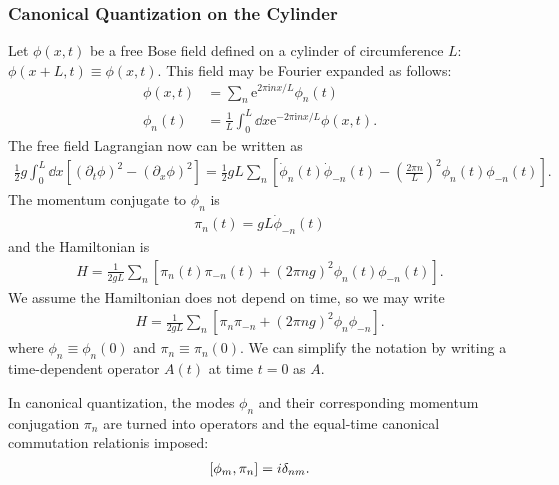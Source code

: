 \documentclass[10pt]{article}
\newcommand{\me}{\mathrm{e}}
\newcommand{\ii}{\mathrm{i}}
\begin{document}
\subsubsection{Canonical Quantization on the Cylinder}
Let $\phi(x,t)$ be a free Bose field defined on a cylinder of circumference $L$: $\phi(x+L,t)\equiv\phi(x,t)$.
This field may be Fourier expanded as follows:
\begin{subequations}
    \begin{align}
        \phi(x,t) & =\sum_n\me^{2\pi\ii nx/L}\phi_n(t)                                                            \\
        \phi_n(t) & =\frac{1}{L}\int_0^L\dd{x}\me^{-2\pi\ii nx/L}\phi(x,t).\label{eq:operator:boson:mode_field:2}
    \end{align}
\end{subequations}
The free field Lagrangian now can be written as
\begin{align}\label{eq:operator:boson:Lagrangian}
    \frac{1}{2}g\int_0^L\dd{x}\left[\left(\partial_t\phi\right)^2-\left(\partial_x\phi\right)^2\right]=\frac{1}{2}gL\sum_n\left[\dot{\phi}_n(t)\dot{\phi}_{-n}(t)-\left(\frac{2\pi n}{L}\right)^2\phi_n(t)\phi_{-n}(t)\right].
\end{align}
The momentum conjugate to $\phi_n$ is
\begin{align}
    \pi_n(t)=gL\dot{\phi}_{-n}(t)
\end{align}
and the Hamiltonian is
\begin{align}
    H=\frac{1}{2gL}\sum_n\left[\pi_n(t)\pi_{-n}(t)+\left(2\pi ng\right)^2\phi_n(t)\phi_{-n}(t)\right].
\end{align}
We assume the Hamiltonian does not depend on time, so we may write
\begin{align}
    H=\frac{1}{2gL}\sum_n\left[\pi_n\pi_{-n}+\left(2\pi ng\right)^2\phi_n\phi_{-n}\right].
\end{align}
where $\phi_n\equiv\phi_n(0)$ and $\pi_n\equiv\pi_n(0)$.
We can simplify the notation by writing a time-dependent operator $A(t)$ at time $t=0$ as $A$.
\begin{property}
    In canonical quantization, the modes $\phi_n$ and their corresponding momentum conjugation $\pi_n$ are turned into operators and the equal-time canonical commutation relation\snm is imposed:
    \begin{align}
        \comm{\phi_m}{\pi_n}=i\delta_{nm}.\label{eq:operator:boson:commutation}
    \end{align}
\end{property}
\end{document}
